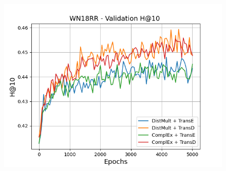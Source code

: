\begin{figure}
\begin{minipage}{.3\textwidth}
    \end{minipage}
    \begin{minipage}{.3\textwidth}
      \centering
      \includegraphics[width=\linewidth]{figures/results/gan_train/pretrained/uncertainty/max_distribution/entropy/wn18rr/5k_epochs/uncertainty_wn18rr_hit10.png}
    \end{minipage}%
    

\end{figure}
